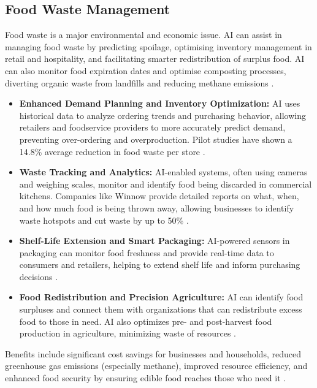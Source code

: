 \subsection{Food Waste Management}
Food waste is a major environmental and economic issue. AI can assist in managing food waste by predicting spoilage, optimising inventory management in retail and hospitality, and facilitating smarter redistribution of surplus food. AI can also monitor food expiration dates and optimise composting processes, diverting organic waste from landfills and reducing methane emissions \cite{sharma2023wastemanagement}.
\begin{itemize}
    \item \textbf{Enhanced Demand Planning and Inventory Optimization:} AI uses historical data to analyze ordering trends and purchasing behavior, allowing retailers and foodservice providers to more accurately predict demand, preventing over-ordering and overproduction. Pilot studies have shown a 14.8\% average reduction in food waste per store \cite{ReFED_FoodWaste, MDPI_FoodWaste}.
    \item \textbf{Waste Tracking and Analytics:} AI-enabled systems, often using cameras and weighing scales, monitor and identify food being discarded in commercial kitchens. Companies like Winnow provide detailed reports on what, when, and how much food is being thrown away, allowing businesses to identify waste hotspots and cut waste by up to 50\% \cite{WinnowSolutions_FoodWaste, Aim2Flourish_FoodWaste}.
    \item \textbf{Shelf-Life Extension and Smart Packaging:} AI-powered sensors in packaging can monitor food freshness and provide real-time data to consumers and retailers, helping to extend shelf life and inform purchasing decisions \cite{SustainabilityLinkedIn_FoodWaste}.
    \item \textbf{Food Redistribution and Precision Agriculture:} AI can identify food surpluses and connect them with organizations that can redistribute excess food to those in need. AI also optimizes pre- and post-harvest food production in agriculture, minimizing waste of resources \cite{InfosysBPM_FoodWaste, FrontiersIn_FoodWaste}.
\end{itemize}
Benefits include significant cost savings for businesses and households, reduced greenhouse gas emissions (especially methane), improved resource efficiency, and enhanced food security by ensuring edible food reaches those who need it \cite{ShapiroE_FoodWaste}.

